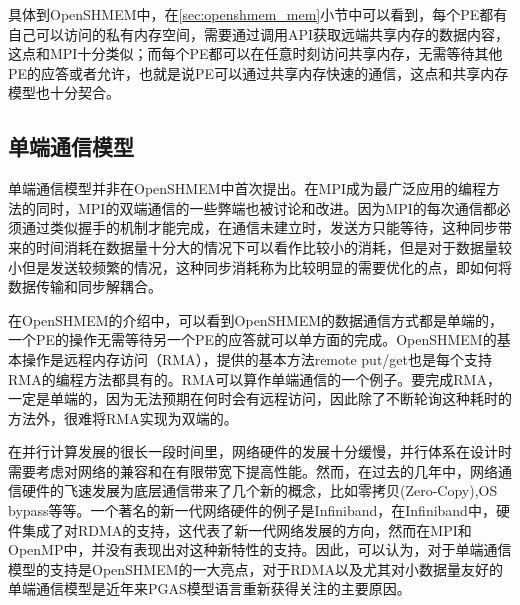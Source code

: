 具体到OpenSHMEM中，在\ref{sec:openshmem_mem}小节中可以看到，每个PE都有自己可以访问的私有内存空间，需要通过调用API获取远端共享内存的数据内容，这点和MPI十分类似；而每个PE都可以在任意时刻访问共享内存，无需等待其他PE的应答或者允许，也就是说PE可以通过共享内存快速的通信，这点和共享内存模型也十分契合。
\subsection{单端通信模型}
单端通信模型并非在OpenSHMEM中首次提出。在MPI成为最广泛应用的编程方法的同时，MPI的双端通信的一些弊端也被讨论和改进。因为MPI的每次通信都必须通过类似握手的机制才能完成，在通信未建立时，发送方只能等待，这种同步带来的时间消耗在数据量十分大的情况下可以看作比较小的消耗，但是对于数据量较小但是发送较频繁的情况，这种同步消耗称为比较明显的需要优化的点，即如何将数据传输和同步解耦合。

在OpenSHMEM的介绍中，可以看到OpenSHMEM的数据通信方式都是单端的，一个PE的操作无需等待另一个PE的应答就可以单方面的完成。OpenSHMEM的基本操作是远程内存访问（RMA），提供的基本方法remote put/get也是每个支持RMA的编程方法都具有的。RMA可以算作单端通信的一个例子。要完成RMA，一定是单端的，因为无法预期在何时会有远程访问，因此除了不断轮询这种耗时的方法外，很难将RMA实现为双端的。

在并行计算发展的很长一段时间里，网络硬件的发展十分缓慢，并行体系在设计时需要考虑对网络的兼容和在有限带宽下提高性能。然而，在过去的几年中，网络通信硬件的飞速发展为底层通信带来了几个新的概念，比如零拷贝(Zero-Copy),OS bypass\cite{jour:cci}等等。一个著名的新一代网络硬件的例子是Infiniband，在Infiniband中，硬件集成了对RDMA的支持，这代表了新一代网络发展的方向，然而在MPI和OpenMP中，并没有表现出对这种新特性的支持。因此，可以认为，对于单端通信模型的支持是OpenSHMEM的一大亮点，对于RDMA以及尤其对小数据量友好的单端通信模型是近年来PGAS模型语言重新获得关注的主要原因。